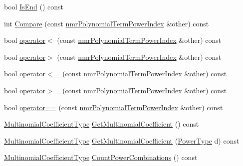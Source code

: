 \begin{DoxyCompactItemize}
\item 
bool \hyperlink{classnmr_polynomial_term_power_index_a4e645bdb125cd8bf1492147164f6df1e}{Is\+End} () const 
\item 
int \hyperlink{classnmr_polynomial_term_power_index_ab2d0e6ddf4ba6552fe41a7f6f36060cf}{Compare} (const \hyperlink{classnmr_polynomial_term_power_index}{nmr\+Polynomial\+Term\+Power\+Index} \&other) const 
\item 
bool \hyperlink{classnmr_polynomial_term_power_index_a86ec950f835100c801b962fab881bdbd}{operator$<$} (const \hyperlink{classnmr_polynomial_term_power_index}{nmr\+Polynomial\+Term\+Power\+Index} \&other) const 
\item 
bool \hyperlink{classnmr_polynomial_term_power_index_a8ddbd08d3ddbbb43c8d2b2560154d878}{operator$>$} (const \hyperlink{classnmr_polynomial_term_power_index}{nmr\+Polynomial\+Term\+Power\+Index} \&other) const 
\item 
bool \hyperlink{classnmr_polynomial_term_power_index_a0c0fc225dd6207be4425830de51ce3bb}{operator$<$=} (const \hyperlink{classnmr_polynomial_term_power_index}{nmr\+Polynomial\+Term\+Power\+Index} \&other) const 
\item 
bool \hyperlink{classnmr_polynomial_term_power_index_aea1064e73eda5c33686077ec34e174fb}{operator$>$=} (const \hyperlink{classnmr_polynomial_term_power_index}{nmr\+Polynomial\+Term\+Power\+Index} \&other) const 
\item 
bool \hyperlink{classnmr_polynomial_term_power_index_a5ec82dca98263dabd273d8b98d0f5920}{operator==} (const \hyperlink{classnmr_polynomial_term_power_index}{nmr\+Polynomial\+Term\+Power\+Index} \&other) const 
\item 
\hyperlink{classnmr_polynomial_term_power_index_a09f482da776cfb829e26ad1fb381ab94}{Multinomial\+Coefficient\+Type} \hyperlink{classnmr_polynomial_term_power_index_a7757268634207837173fee2e7c0bf8eb}{Get\+Multinomial\+Coefficient} () const 
\item 
\hyperlink{classnmr_polynomial_term_power_index_a09f482da776cfb829e26ad1fb381ab94}{Multinomial\+Coefficient\+Type} \hyperlink{classnmr_polynomial_term_power_index_a2f3e9788d333f91ae184a3d3018762af}{Get\+Multinomial\+Coefficient} (\hyperlink{classnmr_polynomial_term_power_index_a2eec01c3a2c3f56f47982ceffd8e36ed}{Power\+Type} d) const 
\item 
\hyperlink{classnmr_polynomial_term_power_index_a09f482da776cfb829e26ad1fb381ab94}{Multinomial\+Coefficient\+Type} \hyperlink{classnmr_polynomial_term_power_index_a23ab097c4291a51ac2ed67913ceb0e09}{Count\+Power\+Combinations} () const 

\end{DoxyCompactItemize}
